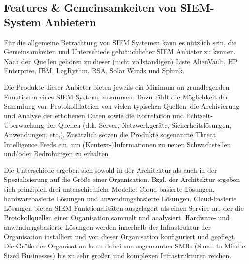 \subsection{Features \&  Gemeinsamkeiten von SIEM-System Anbietern}
Für die allgemeine Betrachtung von SIEM Systemen kann es nützlich sein, die Gemeinsamkeiten und Unterschiede gebräuchlicher SIEM Anbieter zu kennen. Nach den Quellen \citep{SIEMVendors1,SIEMVendors3,SIEMVendors4}
gehören zu dieser (nicht vollständigen) Liste AlienVault, HP Enterprise, IBM, LogRythm, RSA, Solar Winds und Splunk. 

Die Produkte dieser Anbieter bieten jeweils ein Minimum an grundlegenden Funktionen eines SIEM Systems zusammen. Dazu zählt die Möglichkeit der Sammlung von Protokolldateien von vielen typischen Quellen, die Archivierung und Analyse der erhobenen Daten sowie die Korrelation und Echtzeit-Überwachung der Quellen (d.h. Server, Netzwerkgeräte, Sicherheitslösungen, Anwendungen, etc.). Zusätzlich setzen die Produkte sogenannte \glqq Threat Intelligence Feeds\grqq{} ein, um (Kontext-)Informationen zu neuen Schwachstellen und/oder Bedrohungen zu erhalten. 


Die Unterschiede ergeben sich sowohl in der Architektur als auch in der Spezialisierung auf die Größe einer Organisation. 
Bzgl. der Architektur ergeben sich prinzipiell drei unterschiedliche Modelle: Cloud-basierte Lösungen, hardwarebasierte Lösungen und anwendungsbasierte Lösungen. Cloud-basierte Lösungen bieten SIEM Funktionalitäten ausgelagert als einen Service an, der die Protokollquellen einer Organisation sammelt und analysiert. Hardware- und anwendungsbasierte Lösungen werden innerhalb der Infrastruktur der Organisation installiert und von dieser Organisation konfiguriert und gepflegt. Die Größe der Organisation kann dabei von sogenannten \glqq SMBs\grqq{} (Small to Middle Sized Businesses) bis zu sehr großen und komplexen Infrastrukturen reichen.

